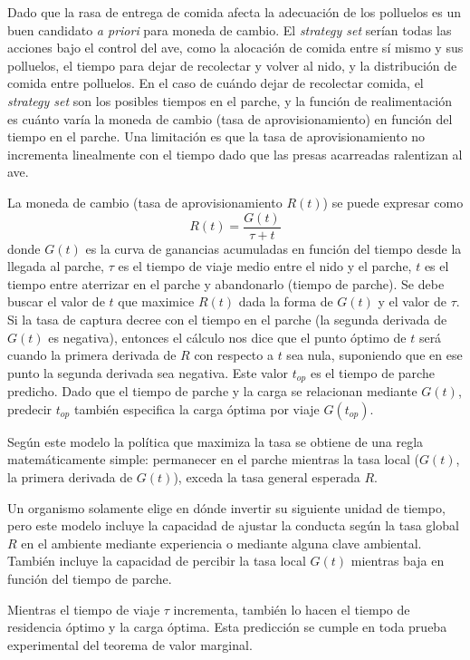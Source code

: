 \documentclass[a4paper,12pt]{article}
\begin{document}
Dado que la rasa de entrega de comida afecta la adecuación de los polluelos es un buen candidato {\itshape a priori} para moneda de cambio. El {\itshape strategy set} serían todas las acciones bajo el control del ave, como la alocación de comida entre sí mismo y sus polluelos, el tiempo para dejar de recolectar y volver al nido, y la distribución de comida entre polluelos. En el caso de cuándo dejar de recolectar comida, el {\itshape strategy set} son los posibles tiempos en el parche, y la función de realimentación es cuánto varía la moneda de cambio (tasa de aprovisionamiento) en función del tiempo en el parche. Una limitación es que la tasa de aprovisionamiento no incrementa linealmente con el tiempo dado que las presas acarreadas ralentizan al ave.

La moneda de cambio (tasa de aprovisionamiento $R(t)$) se puede expresar como
\begin{equation}
	R(t) = 
	\frac{
		G(t)
	}{
		\tau + t
	}
\end{equation}
donde $G(t)$ es la curva de ganancias acumuladas en función del tiempo desde la llegada al parche, $\tau$ es el tiempo de viaje medio entre el nido y el parche, $t$ es el tiempo entre aterrizar en el parche y abandonarlo (tiempo de parche). Se debe buscar el valor de $t$ que maximice $R(t)$ dada la forma de $G(t)$ y el valor de $\tau$. Si la tasa de captura decree con el tiempo en el parche (la segunda derivada de $G(t)$ es negativa), entonces el cálculo nos dice que el punto óptimo de $t$ será cuando la primera derivada de $R$ con respecto a $t$ sea nula, suponiendo que en ese punto la segunda derivada sea negativa. Este valor $t_{op}$ es el tiempo de parche predicho. Dado que el tiempo de parche y la carga se relacionan mediante $G(t)$, predecir $t_{op}$ también especifica la carga óptima por viaje $G(t_{op})$.

Según este modelo la política que maximiza la tasa se obtiene de una regla matemáticamente simple: permanecer en el parche mientras la tasa local ($G(t)$, la primera derivada de $G(t)$), exceda la tasa general esperada $R$. 

Un organismo solamente elige en dónde invertir su siguiente unidad de tiempo, pero este modelo incluye la capacidad de ajustar la conducta según la tasa global $R$ en el ambiente mediante experiencia o mediante alguna clave ambiental. También incluye la capacidad de percibir la tasa local $G(t)$ mientras baja en función del tiempo de parche.

Mientras el tiempo de viaje $\tau$ incrementa, también lo hacen el tiempo de residencia óptimo y la carga óptima. Esta predicción se cumple en toda prueba experimental del teorema de valor marginal.
\end{document}
